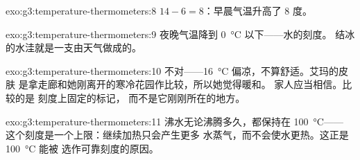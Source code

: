\begin{solution}{exo:g3:temperature-thermometers:8}
$14 - 6 = 8$：早晨气温升高了 $8$ 度。
\end{solution}

\begin{solution}{exo:g3:temperature-thermometers:9}
夜晚气温降到 \qty{0}{\celsius} 以下——水的刻度。
结冰的水洼就是一支由天气做成的。
\end{solution}

\begin{solution}{exo:g3:temperature-thermometers:10}
不对——\qty{16}{\celsius} 偏凉，不算舒适。艾玛的皮肤
是拿走廊和她刚离开的寒冷花园作比较，所以她觉得暖和。
家人应当相信。比较的是
刻度上固定的标记，
而不是它刚刚所在的地方。
\end{solution}

\begin{solution}{exo:g3:temperature-thermometers:11}
沸水无论沸腾多久，都保持在 \qty{100}{\celsius}——
这个刻度是一个上限：继续加热只会产生更多
水蒸气，而不会使水更热。这正是 \qty{100}{\celsius} 能被
选作可靠刻度的原因。
\end{solution}
